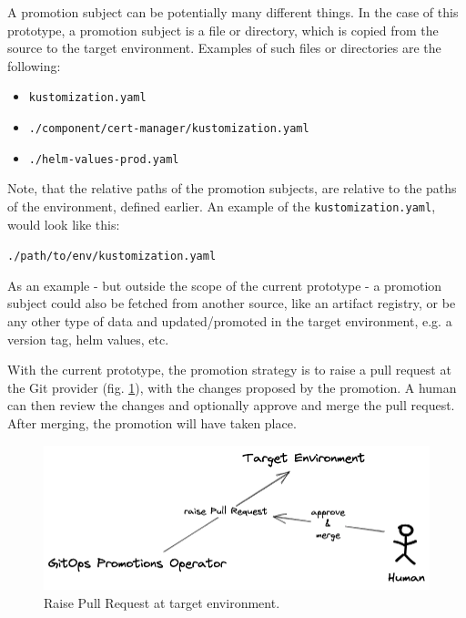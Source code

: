 A promotion subject can be potentially many different things.
In the case of this prototype,
a promotion subject is a file or directory,
which is copied from the source to the target environment.
Examples of such files or directories are the following:

\begin{itemize}
	\item \lstinline|kustomization.yaml|
	\item \lstinline|./component/cert-manager/kustomization.yaml|
	\item \lstinline|./helm-values-prod.yaml|
\end{itemize}

Note, that the relative paths of the promotion subjects,
are relative to the paths of the environment, defined earlier.
An example of the \lstinline|kustomization.yaml|, would look like this:

\lstinline|./path/to/env/kustomization.yaml|

As an example - but outside the scope of the current prototype -
a promotion subject could also be fetched from another source,
like an artifact registry, or be any other type of data
and updated/promoted in the target environment,
e.g. a version tag, helm values, etc.

With the current prototype,
the promotion strategy is to raise a pull request at the Git provider
(fig. \ref{fig:raise-pull-request-and-approve}),
with the changes proposed by the promotion.
A human can then review the changes and optionally approve and merge the pull request.
After merging, the promotion will have taken place.

\begin{figure}[h]
	\centering
	\includegraphics[width=1.00\linewidth]{assets/raise-pull-request-and-approve.png}
	\caption{Raise Pull Request at target environment.
	}
	\label{fig:raise-pull-request-and-approve}	
\end{figure}

